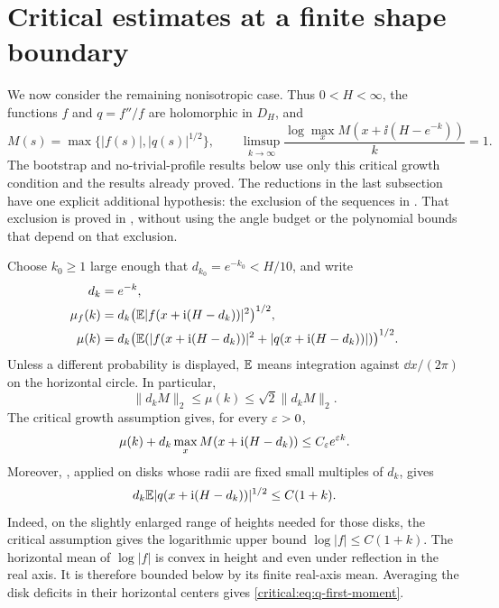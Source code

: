 \section{Critical estimates at a finite shape boundary}
\label{sec:critical}

We now consider the remaining nonisotropic case. Thus \(0<H<\infty\),
the functions \(f\) and \(q=f''/f\) are holomorphic in \(D_H\), and
\[
 M(s)=\max\{|f(s)|,|q(s)|^{1/2}\},\qquad
 \limsup_{k\to\infty}\frac{\log\max_x M(x+\ii(H-e^{-k}))}{k}=1.
\]
The bootstrap and no-trivial-profile results below use only this
critical growth condition and the results already proved. The
reductions in the last subsection have one explicit additional
hypothesis: the exclusion of the sequences in
. That exclusion is proved in
, without using the angle budget or the
polynomial bounds that depend on that exclusion.

Choose \(k_0\ge 1\) large enough that \(d_{k_0}=e^{-k_0}<H/10\),
and write
\begin{equation}\label{critical:eq:means}
 \begin{split}
 d_k&=e^{-k},\\
 \mu_f(k)&=d_k\bigl(\mathbb E |f(x+\mathrm i(H-d_k))|^2\bigr)^{1/2},\\
 \mu(k)&=d_k\bigl(\mathbb E(|f(x+\mathrm i(H-d_k))|^2
                         +|q(x+\mathrm i(H-d_k))|)\bigr)^{1/2}.
 \end{split}
\end{equation}
Unless a different probability is displayed, \(\mathbb E\) means integration
against \(\dd x/(2\pi)\) on the horizontal circle. In particular,
\[
 \|d_kM\|_2\le\mu(k)\le\sqrt{2}\|d_kM\|_2.
\]
The critical growth assumption gives, for every \(\varepsilon>0\),
\begin{equation}\label{critical:eq:subexponential}
 \mu(k)+d_k\max_x M(x+\mathrm i(H-d_k))
 \le C_\varepsilon e^{\varepsilon k}.
\end{equation}
Moreover, , applied on disks whose radii are fixed
small multiples of \(d_k\), gives
\begin{equation}\label{critical:eq:q-first-moment}
 d_k\mathbb E |q(x+\mathrm i(H-d_k))|^{1/2}\le C(1+k).
\end{equation}
Indeed, on the slightly enlarged range of heights needed for those
disks, the critical assumption gives the logarithmic upper bound
\(\log|f|\le C(1+k)\). The horizontal mean of \(\log|f|\) is convex
in height and even under reflection in the real axis. It is therefore
bounded below by its finite real-axis mean. Averaging the disk deficits
in their horizontal centers gives \eqref{critical:eq:q-first-moment}.

